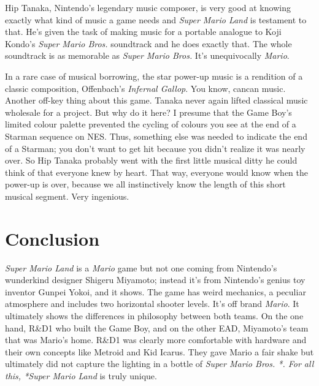 \documentclass{book}
\begin{document}
Hip Tanaka, Nintendo’s legendary music composer, is very good at knowing exactly what kind of music a game needs and \emph{Super Mario Land} is testament to that. He’s given the task of making music for a portable analogue to Koji Kondo’s \emph{Super Mario Bros.} soundtrack and he does exactly that. The whole soundtrack is as memorable as \emph{Super Mario Bros.} It’s unequivocally \emph{Mario}.

In a rare case of musical borrowing, the star power-up music is a rendition of a classic composition, Offenbach’s \emph{Infernal Gallop}. You know, cancan music. Another off-key thing about this game. Tanaka never again lifted classical music wholesale for a project. But why do it here? I presume that the Game Boy’s limited colour palette prevented the cycling of colours you see at the end of a Starman sequence on NES. Thus, something else was needed to indicate the end of a Starman; you don’t want to get hit because you didn’t realize it was nearly over. So Hip Tanaka probably went with the first little musical ditty he could think of that everyone knew by heart. That way, everyone would know when the power-up is over, because we all instinctively know the length of this short musical segment. Very ingenious.

\FloatBarrier\needspace{10mm}\section*{Conclusion}\nopagebreak[4]

\emph{Super Mario Land} is a \emph{Mario} game but not one coming from Nintendo’s wunderkind designer Shigeru Miyamoto; instead it’s from Nintendo’s genius toy inventor Gunpei Yokoi, and it shows. The game has weird mechanics, a peculiar atmosphere and includes two horizontal shooter levels. It’s off brand \emph{Mario}. It ultimately shows the differences in philosophy between both teams. On the one hand, R\&D1 who built the Game Boy, and on the other EAD, Miyamoto’s team that was Mario’s home. R\&D1 was clearly more comfortable with hardware and their own concepts like Metroid and Kid Icarus. They gave Mario a fair shake but ultimately did not capture the lighting in a bottle of \emph{Super Mario Bros. *. For all this, *Super Mario Land} is truly unique.
\end{document}
